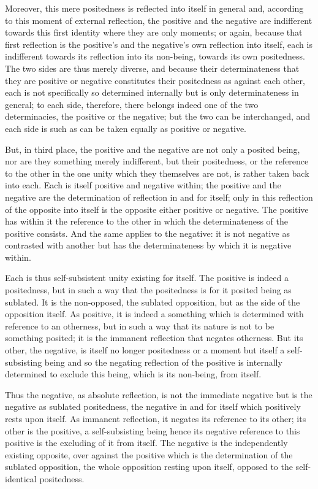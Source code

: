 Moreover, this mere positedness is
reflected into itself in general
and, according to this moment of external reflection,
the positive and the negative are indifferent towards
this first identity where they are only moments;
or again, because that first reflection is
the positive's and the negative's own
reflection into itself,
each is indifferent towards its reflection
into its non-being, towards its own positedness.
The two sides are thus merely diverse,
and because their determinateness
that they are positive or negative
constitutes their positedness as against each other,
each is not specifically so determined internally
but is only determinateness in general;
to each side, therefore, there belongs indeed
one of the two determinacies,
the positive or the negative;
but the two can be interchanged,
and each side is such as
can be taken equally as positive or negative.

But, in third place, the positive and the negative are
not only a posited being,
nor are they something merely indifferent,
but their positedness,
or the reference to the other in the one unity
which they themselves are not,
is rather taken back into each.
Each is itself positive and negative within;
the positive and the negative are
the determination of reflection in and for itself;
only in this reflection of the opposite into itself is
the opposite either positive or negative.
The positive has within it the reference to
the other in which the determinateness of the positive consists.
And the same applies to the negative:
it is not negative as contrasted with another
but has the determinateness by which it is negative within.

Each is thus self-subsistent unity existing for itself.
The positive is indeed a positedness,
but in such a way that the positedness is
for it posited being as sublated.
It is the non-opposed, the sublated opposition,
but as the side of the opposition itself.
As positive, it is indeed a something
which is determined with reference to an otherness,
but in such a way that its nature
is not to be something posited;
it is the immanent reflection
that negates otherness.
But its other, the negative,
is itself no longer positedness or a moment
but itself a self-subsisting being
and so the negating reflection
of the positive is internally
determined to exclude this being,
which is its non-being, from itself.

Thus the negative, as absolute reflection,
is not the immediate negative
but is the negative as sublated positedness,
the negative in and for itself
which positively rests upon itself.
As immanent reflection,
it negates its reference to its other;
its other is the positive,
a self-subsisting being
hence its negative reference
to this positive is
the excluding of it from itself.
The negative is the independently existing opposite,
over against the positive
which is the determination of the sublated opposition,
the whole opposition resting upon itself,
opposed to the self-identical positedness.

